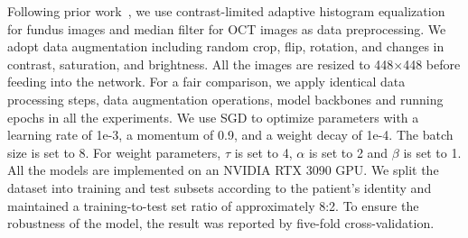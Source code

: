 \documentclass[runningheads]{llncs}
\newcommand{\xmli}[1]{{\color{red}{[XM: #1]}}}
\begin{document}
Following prior work~\cite{wang2019two,wang2022learning}, we use contrast-limited adaptive histogram equalization for fundus images and median filter for OCT images as data preprocessing. We adopt data augmentation including random crop, flip, rotation, and changes in contrast, saturation, and brightness. 
All the images are resized to 448$\times$448 before feeding into the network.
For a fair comparison, we apply identical data processing steps, data augmentation operations, model backbones and running epochs in all the experiments.
We use SGD to optimize parameters with a learning rate of 1e-3, a momentum of 0.9, and a weight decay of 1e-4. The batch size is set to 8. For weight parameters, $\tau$ is set to 4, $\alpha$ is set to 2 and $\beta$ is set to 1. All the models are implemented on an NVIDIA RTX 3090 GPU. We split the dataset into training and test subsets according to the patient's identity and maintained a training-to-test set ratio of approximately 8:2. To ensure the robustness of the model, the result was reported by five-fold cross-validation.

\end{document}
